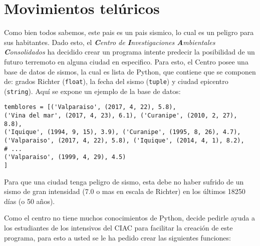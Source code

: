 \section{Movimientos telúricos}

Como bien todos sabemos, este pais es un pais sismico, lo cual es un peligro para sus habitantes. Dado esto, el  \textit{\textbf{C}entro de \textbf{I}nvestigaciones \textbf{A}mbientales \textbf{C}onsolidados} ha decidido crear un programa intente predecir la posibilidad de un futuro terremoto en alguna ciudad en especifico. Para esto, el Centro posee una base de datos de sismos, la cual es lista de Python, que contiene que se componen de: grados Richter (\texttt{float}), la fecha del sismo (\texttt{tuple}) y ciudad epicentro (\texttt{string}). Aquí se expone un ejemplo de la base de datos:

\begin{lstlisting}[style=consola]
temblores = [('Valparaiso', (2017, 4, 22), 5.8), 
('Vina del mar', (2017, 4, 23), 6.1), ('Curanipe', (2010, 2, 27), 8.8), 
('Iquique', (1994, 9, 15), 3.9), ('Curanipe', (1995, 8, 26), 4.7), 
('Valparaiso', (2017, 4, 22), 5.8), ('Iquique', (2014, 4, 1), 8.2), 
# ...
('Valparaiso', (1999, 4, 29), 4.5)
]
\end{lstlisting}

Para que una ciudad tenga peligro de sismo, esta debe no haber sufrido de un sismo de gran intensidad (7.0 o mas en escala de Richter) en los últimos 18250 días (o 50 años). 

Como el centro no tiene muchos conocimientos de Python, decide pedirle ayuda a los estudiantes de los intensivos del CIAC para facilitar la creación de este programa, para esto a usted se le ha pedido crear las siguientes funciones:

